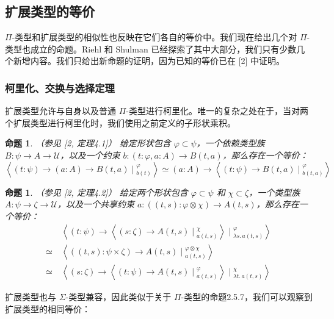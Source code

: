 \documentclass{ctexrep}
\theoremstyle{plain}
\newtheorem{proposition}[theorem]{命题}
\theoremstyle{definition}
\theoremstyle{remark}
\theoremstyle{definition}
\theoremstyle{definition}
\theoremstyle{definition}
\newcommand{\UU}{\mathcal{U}}
\begin{document}
\subsection{扩展类型的等价}

$\Pi$-类型和扩展类型的相似性也反映在它们各自的等价中。我们现在给出几个对 $\Pi$-类型也成立的命题。Riehl 和 Shulman 已经探索了其中大部分，我们只有少数几个新增内容。我们只给出新命题的证明，因为已知的等价已在 [2] 中证明。

\subsubsection{柯里化、交换与选择定理}

扩展类型允许与自身以及普通 $\Pi$-类型进行柯里化。唯一的复杂之处在于，当对两个扩展类型进行柯里化时，我们使用之前定义的子形状乘积。

\begin{proposition}（参见 [2, 定理4.1]）
给定形状包含 $\varphi \subset \psi$，一个依赖类型族 $B:\psi \to A \to \UU$，以及一个约束 $b:(t:\varphi,a:A)\to B(t,a)$，那么存在一个等价：
\[
\left\langle (t : \psi) \to (a : A) \to B(t, a) \mid {}^{\varphi}_{b(t)} \right\rangle \simeq (a : A) \to \left\langle (t : \psi) \to B(t, a) \mid {}^{\varphi}_{b(t, a)} \right\rangle
\]
\end{proposition}

\begin{proposition}（参见 [2, 定理4.2]）
给定两个形状包含 $\varphi \subset \psi$ 和 $\chi \subset \zeta$，一个类型族 $A:\psi \to \zeta \to \UU$，以及一个共享约束 $a:((t,s):\varphi \otimes \chi)\to A(t,s)$，那么存在一个等价：
\begin{align*}
    &\left\langle (t : \psi) \to \left\langle (s : \zeta) \to A(t, s) \mid {}^{\chi}_{a(t, s)} \right\rangle \mid {}^{\varphi}_{\lambda s.\, a(t, s)} \right\rangle \\
    \simeq\ &\left\langle ((t, s) : \psi \times \zeta) \to A(t, s) \mid {}^{\varphi \otimes \chi}_{a(t, s)} \right\rangle \\
    \simeq\ &\left\langle (s : \zeta) \to \left\langle (t : \psi) \to A(t, s) \mid {}^{\varphi}_{a(t, s)} \right\rangle \mid {}^{\chi}_{\lambda t.\, a(t, s)} \right\rangle
\end{align*}
\end{proposition}

扩展类型也与 $\Sigma$-类型兼容，因此类似于关于 $\Pi$-类型的命题2.5.7，我们可以观察到扩展类型的相同等价：
\end{document}
